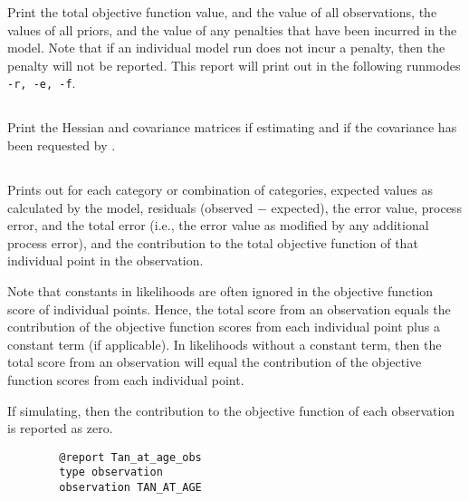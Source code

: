 Print the total objective function value, and the value of all observations, the values of all priors, and the value of any penalties that have been incurred in the model. Note that if an individual model run does not incur a penalty, then the penalty will not be reported. This report will print out in the following runmodes \texttt{-r, -e, -f}.

\subsection{}

Print the Hessian and covariance matrices if estimating and if the covariance has been requested by .

\subsection{}

Prints out for each category or combination of categories, expected values as calculated by the model, residuals (observed $-$ expected), the error value, process error, and the total error (i.e., the error value as modified by any additional process error), and the contribution to the total objective function of that individual point in the observation. 

Note that constants in likelihoods are often ignored in the objective function score of individual points. Hence, the total score from an observation equals the contribution of the objective function scores from each individual point plus a constant term (if applicable). In likelihoods without a constant term, then the total score from an observation will equal the contribution of the objective function scores from each individual point.

If simulating, then the contribution to the objective function of each observation is reported as zero. 

{\small{\begin{verbatim}
		@report Tan_at_age_obs
		type observation
		observation TAN_AT_AGE
		\end{verbatim}}}

\subsection{}

